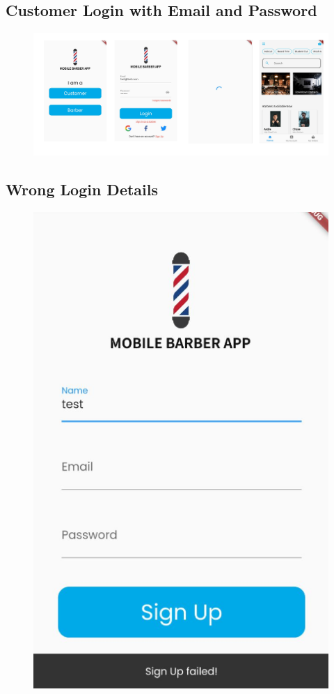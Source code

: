 \documentclass[12pt]{article}
\begin{document}
	\subsection{Customer Login with Email and Password}
	\label{app-image: login-email}
	\begin{figure}[H]
		\centering
		\includegraphics[scale=0.22]{images/email-login.png}
	\end{figure}

	\subsection{Wrong Login Details}
	\label{app-image: wrong-login}
	\begin{figure}[H]
		\centering
		\includegraphics[scale=0.4]{images/sign-up-failed.png}
	\end{figure}
\end{document}
